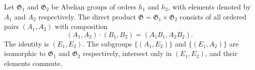 Let $\mathfrak{G}_1$ and $\mathfrak{G}_2$ be Abelian groups of orders $h_1$ and $h_2$, with elements denoted by $A_1$ and $A_2$ respectively. The direct product $\mathfrak{G} = \mathfrak{G}_1 \times \mathfrak{G}_2$ consists of all ordered pairs $(A_1, A_2)$ with composition
$$(A_1, A_2) \cdot (B_1, B_2) = (A_1 B_1, A_2 B_2).$$
The identity is $(E_1, E_2)$. The subgroups $\{(A_1, E_2)\}$ and $\{(E_1, A_2)\}$ are isomorphic to $\mathfrak{G}_1$ and $\mathfrak{G}_2$ respectively, intersect only in $(E_1, E_2)$, and their elements commute.
